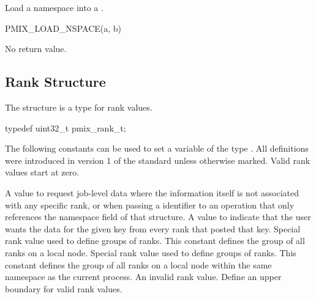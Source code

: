 
Load a namespace into a .

\cspecificstart
\begin{codepar}
PMIX_LOAD_NSPACE(a, b)
\end{codepar}
\cspecificend

\begin{arglist}
\end{arglist}

No return value.


\subsection{Rank Structure}

The  structure is a  type for rank values.

\cspecificstart
\begin{codepar}
typedef uint32_t pmix_rank_t;
\end{codepar}
\cspecificend

The following constants can be used to set a variable of the type . All definitions were introduced in version 1 of the standard unless otherwise marked. Valid rank values start at zero.

\begin{constantdesc}
%
A value to request job-level data where the information itself is not associated with any specific rank, or when passing a  identifier to an operation that only references the namespace field of that structure.
%
A value to indicate that the user wants the data for the given key from every rank that posted that key.
%
Special rank value used to define groups of ranks.
This constant defines the group of all ranks on a local node.
%
Special rank value used to define groups of ranks.
This constant defines the group of all ranks on a local node within the same namespace as the current process.
%
An invalid rank value.
%
Define an upper boundary for valid rank values.
%
\end{constantdesc}


